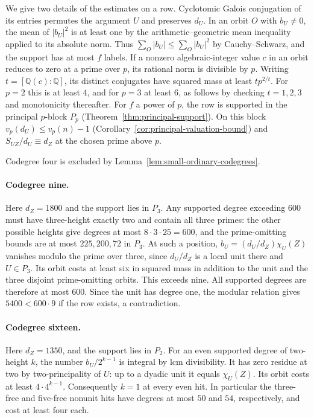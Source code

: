 \documentclass[11pt,a4paper]{article}
\numberwithin{equation}{section}
\theoremstyle{remark}
\newcommand{\QQ}{\mathbb Q}
\begin{document}
We give two details of the estimates on a row. Cyclotomic Galois conjugation of its entries permutes the argument $U$ and preserves $d_U$. In an orbit $O$ with $b_U\ne0$, the mean of $|b_U|^2$ is at least one by the arithmetic--geometric mean inequality applied to its absolute norm. Thus $\sum_O|b_U|\le\sum_O|b_U|^2$ by Cauchy--Schwarz, and the support has at most $f$ labels. If a nonzero algebraic-integer value $c$ in an orbit reduces to zero at a prime over $p$, its rational norm is divisible by $p$. Writing $t=[\QQ(c):\QQ]$, its distinct conjugates have squared mass at least $t p^{2/t}$. For $p=2$ this is at least $4$, and for $p=3$ at least $6$, as follows by checking $t=1,2,3$ and monotonicity thereafter.
For $f$ a power of $p$, the row is supported in the principal $p$-block $P_p$ (Theorem~\ref{thm:principal-support}). On this block $v_p(d_U)\le v_p(n)-1$ (Corollary~\ref{cor:principal-valuation-bound}) and $S_{UZ}/d_U\equiv d_Z$ at the chosen prime above $p$.

Codegree four is excluded by Lemma~\ref{lem:small-ordinary-codegrees}.

\paragraph{Codegree nine.}
Here $d_Z=1800$ and the support lies in $P_3$. Any supported degree exceeding $600$ must have three-height exactly two and contain all three primes: the other possible heights give degrees at most $8\cdot3\cdot25=600$, and the prime-omitting bounds are at most $225,200,72$ in $P_3$. At such a position, $b_U=(d_U/d_Z)\chi_U(Z)$ vanishes modulo the prime over three, since $d_U/d_Z$ is a local unit there and $U\in P_3$. Its orbit costs at least six in squared mass in addition to the unit and the three disjoint prime-omitting orbits. This exceeds nine. All supported degrees are therefore at most $600$. Since the unit has degree one, the modular relation gives $5400<600\cdot9$ if the row exists, a contradiction.

\paragraph{Codegree sixteen.}
Here $d_Z=1350$, and the support lies in $P_2$. For an even supported degree of two-height $k$, the number $b_U/2^{k-1}$ is integral by lcm divisibility. It has zero residue at two by two-principality of $U$: up to a dyadic unit it equals $\chi_U(Z)$. Its orbit costs at least $4\cdot4^{k-1}$. Consequently $k=1$ at every even hit. In particular the three-free and five-free nonunit hits have degrees at most $50$ and $54$, respectively, and cost at least four each.
\end{document}
